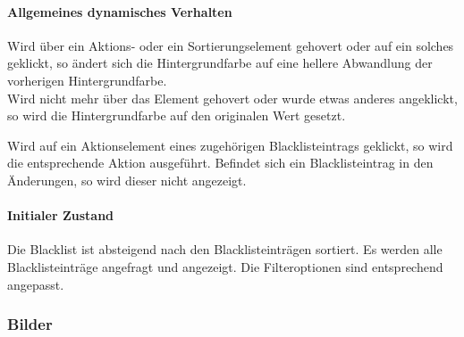 \paragraph*{Allgemeines dynamisches Verhalten}
Wird über ein Aktions- oder ein Sortierungselement gehovert oder auf ein solches geklickt, so ändert sich die Hintergrundfarbe auf eine hellere Abwandlung der vorherigen Hintergrundfarbe. \\
Wird nicht mehr über das Element gehovert oder wurde etwas anderes angeklickt, so wird die Hintergrundfarbe auf den originalen Wert gesetzt.

Wird auf ein Aktionselement eines zugehörigen Blacklisteintrags geklickt, so wird die entsprechende Aktion ausgeführt.
Befindet sich ein Blacklisteintrag in den Änderungen, so wird dieser nicht angezeigt.

\paragraph*{Initialer Zustand}
Die Blacklist ist absteigend nach den Blacklisteinträgen sortiert.
Es werden alle Blacklisteinträge angefragt und angezeigt.
Die Filteroptionen sind entsprechend angepasst.

\subsubsection*{Bilder}
\begin{minipage}{\linewidth}
    \centering
    \begin{minipage}{.69\textwidth}
        \captionsetup[figure]{labelformat=empty}
        \captionsetup[figure]{labelformat=default}
    \end{minipage}
    \begin{minipage}{.3\textwidth}
        \captionsetup[figure]{labelformat=empty}
        \captionsetup[figure]{labelformat=default}
    \end{minipage}
\end{minipage}